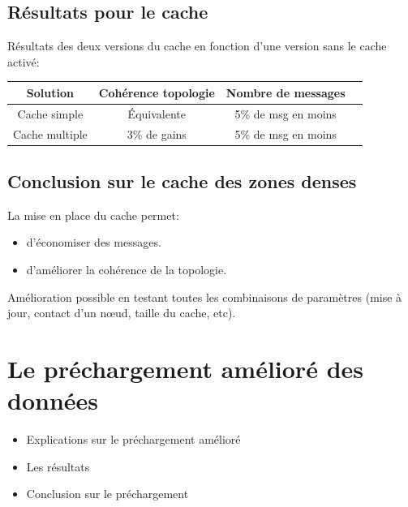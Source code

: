 \documentclass{beamer}
\begin{document}
  \subsection{Résultats pour le cache}
  \begin{frame}
  	Résultats des deux versions du cache en fonction d'une version sans le cache activé:
	\begin{table}[!h]
  		\begin{center}
    		\begin{tabular}{|c|c|c|c|}
      		\hline
      		Solution & Cohérence topologie & Nombre de messages \\
      		\hline
      		Cache simple & Équivalente &  5\% de msg en moins\\
      		Cache multiple & 3\% de gains &  5\% de msg en moins\\
      		\hline
    		\end{tabular}
  		\end{center}
  		\label{tab:config1}
	\end{table}
	
  \end{frame}
	
  \subsection{Conclusion sur le cache des zones denses}
  \begin{frame}
  	La mise en place du cache permet:\\
	\begin{itemize}
		\item d'économiser des messages.\\
		\item d'améliorer la cohérence de la topologie.\\
	\end{itemize}
	\vspace{5mm}
	Amélioration possible en testant toutes les combinaisons de paramètres (mise à jour, contact d'un nœud, taille du cache, etc).\\
  \end{frame}



  \section{Le préchargement amélioré des données}
  \begin{frame}
	\begin{itemize}
		\item Explications sur le préchargement amélioré
		\item Les résultats 
		\item Conclusion sur le préchargement
	\end{itemize}
  \end{frame}
\end{document}
